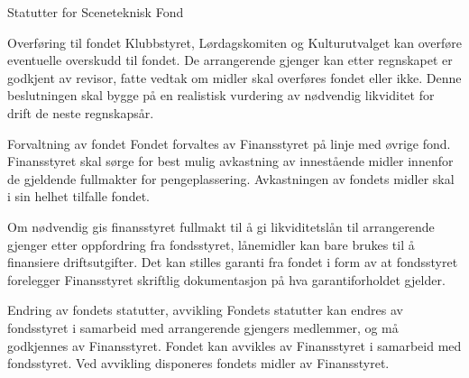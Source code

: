 \begin{fond}{Statutter for Sceneteknisk Fond}
    \begin{fondsparagraf}{Overføring til fondet}
        Klubbstyret, Lørdagskomiten og Kulturutvalget kan overføre eventuelle overskudd til
        fondet. De arrangerende gjenger
        kan etter regnskapet er godkjent av revisor, fatte vedtak om midler skal overføres fondet
        eller ikke. Denne
        beslutningen skal bygge på en realistisk vurdering av nødvendig likviditet for drift de
        neste regnskapsår.
    \end{fondsparagraf}

    \begin{fondsparagraf}{Forvaltning av fondet}
        Fondet forvaltes av Finansstyret på linje med øvrige fond. Finansstyret skal sørge for
        best mulig avkastning av
        innestående midler innenfor de gjeldende fullmakter for pengeplassering. Avkastningen av
        fondets midler skal i sin
        helhet tilfalle fondet.

        Om nødvendig gis finansstyret fullmakt til å gi likviditetslån til arrangerende gjenger
        etter oppfordring fra fondsstyret,
        lånemidler kan bare brukes til å finansiere driftsutgifter. Det kan stilles garanti fra
        fondet i form av at fondsstyret
        forelegger Finansstyret skriftlig dokumentasjon på hva garantiforholdet gjelder.
    \end{fondsparagraf}

    \begin{fondsparagraf}{Endring av fondets statutter, avvikling}
        Fondets statutter kan endres av fondsstyret i samarbeid med arrangerende gjengers
        medlemmer, og må godkjennes av
        Finansstyret. Fondet kan avvikles av Finansstyret i samarbeid med fondsstyret. Ved
        avvikling disponeres fondets
        midler av Finansstyret.
    \end{fondsparagraf}

\end{fond}


